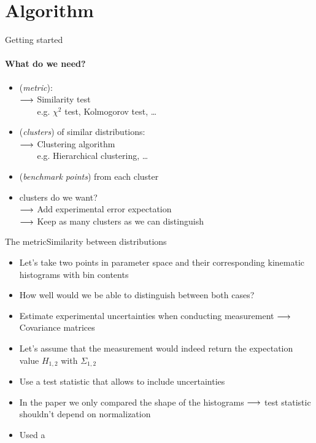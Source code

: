 \section{Algorithm}

\begin{frame}[t]{Getting started}
    \framesubtitle{What do we need?}
	
    \vspace{0.5cm}
    \begin{itemize}
    \item<+->{
         {\color{purple}(\emph{metric})}:\\
    	$\longrightarrow$ Similarity test\\
        $\phantom{\lra}$ {\small e.g. $\chi^2$ test, Kolmogorov test, \dots}
	}
    
    \item<+->{
    	\bigskip
    	 {\color{purple}(\emph{clusters})} of similar distributions:\\
    	$\longrightarrow$ Clustering algorithm\\
        $\phantom{\lra}$ {\small e.g. Hierarchical clustering, \dots}
    }
    
    \item<+->{
        \bigskip
         {\color{purple}(\emph{benchmark points})} from each cluster
    }
    
    \item<+->{
    	\bigskip
    	 clusters do we want?\\
    	$\longrightarrow$ Add experimental error expectation\\
    	$\longrightarrow$ Keep as many clusters as we can distinguish
    }
    \end{itemize}
\end{frame}

\begin{frame}{The metric}{Similarity between distributions}
	\begin{itemize}
		\item Let's take two points in parameter space and their corresponding kinematic histograms  with bin contents 
		\item How well would we be able to distinguish between both cases?
		\item Estimate experimental uncertainties when conducting measurement  $\longrightarrow$ Covariance matrices  
		\item Let's assume that the measurement would indeed return the expectation value $H_{1,2}$ with $\Sigma_{1,2}$
		\item Use a test statistic that allows to include uncertainties 
		\item In the paper we only compared the shape of the histograms $\longrightarrow$ test statistic shouldn't depend on normalization
		\item Used a  	
	\end{itemize}
\end{frame}


